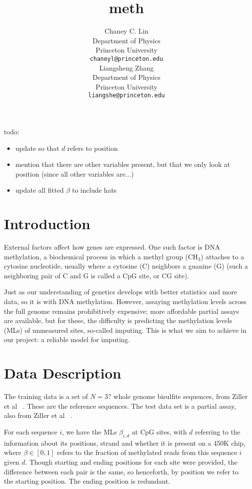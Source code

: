\documentclass{article} %
\title{meth}
\author{
Chaney C. Lin\\
Department of Physics\\
Princeton University\\
\texttt{chaneyl@princeton.edu} \\
\And
Liangsheng Zhang\\
Department of Physics\\
Princeton University\\
\texttt{liangshe@princeton.edu} \\
}
\begin{document}
\maketitle

\begin{abstract}
\end{abstract}

todo:
\begin{itemize}
\item update so that $d$ refers to position
\item mention that there are other variables present, but that we only look at position (since all other variables are...)
\item update all fitted $\beta$ to include hats
\end{itemize}
\section{Introduction}

External factors affect how genes are expressed. One such factor is DNA methylation, a biochemical process in which a methyl group (CH$_3$) attaches to a cytosine nucleotide, usually where a cytosine (C) neighbors a guanine (G) (such a neighboring pair of C and G is called a CpG site, or CG site).

Just as our understanding of genetics develops with better statistics and more data, so it is with DNA methylation. However, assaying methylation levels across the full genome remains prohibitively expensive; more affordable partial assays are available, but for these, the difficulty is predicting the methylation levels (MLs) of unmeasured sites, so-called imputing. This is what we aim to achieve in our project: a reliable model for imputing.

\section{Data Description}

The training data is a set of $N = 3?$ whole genome bisulfite sequences, from Ziller et al ~\cite{ziller2013charting}. These are the reference sequences. The test data set is a partial assay, also from Ziller et al ~\cite{ziller2013charting}.

For each sequence $i$, we have the MLs $\beta_{i,d}$ at CpG sites, with $d$ referring to the information about its positions, strand and whether it is present on a 450K chip, where $\beta \in [0,1]$ refers to the fraction of methylated reads from this sequence $i$ given $d$. Though starting and ending positions for each site were provided, the difference between each pair is the same, so henceforth, by position we refer to the starting position. The ending position is redundant.
\end{document}
